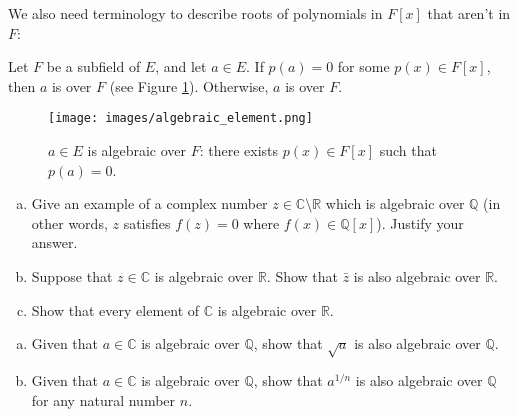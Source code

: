 We also need terminology to describe roots of polynomials in $F[x]$ that aren't in $F$:

\begin{defn}\label{def:algover}  
Let $F$ be a subfield of $E$, and let $a\in E$. If $p(a)=0$ for some $p(x) \in F[x]$, then $a$ is  over $F$ (see Figure \ref{algebraicelement}). Otherwise, $a$  is  over $F$.
\end{defn}

\begin{figure}
\begin{center}
\texttt{[image: images/algebraic\_element.png]}
\caption{$a\in E$ is algebraic over $F$:  there exists $p(x)\in F[x]$ such that $p(a)=0$.}\label{algebraicelement}
\end{center}
\end{figure}

\begin{exercise}
\begin{enumerate}[(a)]
\item
Give an example of a complex number $z \in \mathbb{C}\setminus \mathbb{R}$ which is algebraic over $\mathbb{Q}$ (in other words, $z$ satisfies $f(z)=0$ where $f(x) \in \mathbb Q[x]$). Justify your answer.
\item
Suppose that $z \in \mathbb{C}$ is algebraic over $\mathbb{R}$. Show that $\bar{z}$ is also algebraic over $\mathbb{R}$.
\item
Show that every element of $\mathbb{C}$ is algebraic over $\mathbb{R}$.
\end{enumerate}
\end{exercise}


\begin{exercise}
\begin{enumerate}[(a)]
\item
Given that $a \in \mathbb{C}$ is algebraic over $\mathbb{Q}$, show that $\sqrt{a}$ is also algebraic over $\mathbb{Q}$.
\item
Given that $a \in \mathbb{C}$ is algebraic over $\mathbb{Q}$, show that $a^{1/n}$ is also algebraic over $\mathbb{Q}$ for any natural number $n$.
\end{enumerate}
\end{exercise}


